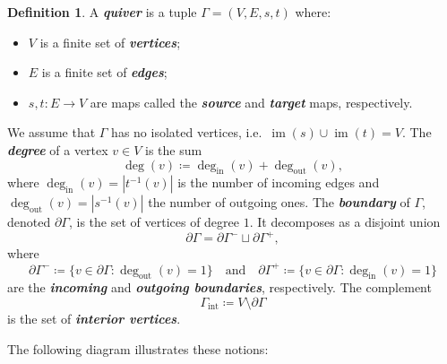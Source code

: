 \documentclass[reqno]{amsart}
\theoremstyle{plain}
\theoremstyle{definition}
\newtheorem{Def}[Thm]{Definition}
\newcommand{\defn}[1]{\textbf{\textit{#1}}}
\newcommand{\sint}{_{\mathrm{int}}}
\begin{document}
\begin{Def}
A \defn{quiver} is a tuple $\Gamma = (V, E, s, t)$ where:
\begin{itemize}
    \item $V$ is a finite set of \defn{vertices};
    \item $E$ is a finite set of \defn{edges};
    \item $s, t : E \to V$ are maps called the \defn{source} and \defn{target} maps, respectively.
\end{itemize}
We assume that $\Gamma$ has no isolated vertices, i.e.\ $\operatorname{im}(s) \cup \operatorname{im}(t) = V$.  
The \defn{degree} of a vertex $v \in V$ is the sum
\[
\deg(v) \coloneqq \deg_{\mathrm{in}}(v) + \deg_{\mathrm{out}}(v),
\]
where $\deg_{\mathrm{in}}(v) = |t^{-1}(v)|$ is the number of incoming edges and $\deg_{\mathrm{out}}(v) = |s^{-1}(v)|$ the number of outgoing ones.
The \defn{boundary} of $\Gamma$, denoted $\partial\Gamma$, is the set of vertices of degree $1$. 
It decomposes as a disjoint union
\[
\partial\Gamma = \partial\Gamma^- \sqcup \partial\Gamma^+,
\]
where
\[
\partial\Gamma^- \coloneqq \{v \in \partial\Gamma : \deg_{\mathrm{out}}(v) = 1\}
\quad\text{and}\quad
\partial\Gamma^+ \coloneqq \{v \in \partial\Gamma : \deg_{\mathrm{in}}(v) = 1\}
\]
are the \defn{incoming} and \defn{outgoing boundaries}, respectively.  
The complement
\[
\Gamma\sint \coloneqq V \setminus \partial\Gamma
\]
is the set of \defn{interior vertices}.
\end{Def}

The following diagram illustrates these notions:
\end{document}
